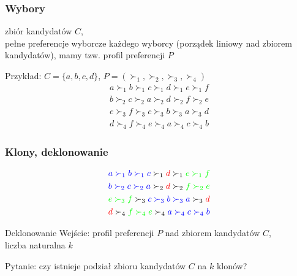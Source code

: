 \documentclass{beamer}
\begin{document}
\begin{frame} \frametitle{Wybory}
  zbiór kandydatów $C$, \\ 
  pełne preferencje wyborcze każdego wyborcy (porządek liniowy nad zbiorem kandydatów), mamy tzw. profil preferencji $P$

	\vfill

	Przykład: $C = \{a, b, c, d\}$, $P = (\succ_1, \succ_2, \succ_3, \succ_4)$
   	\begin{align*}
		a \succ_1 b \succ_1 c \succ_1 d \succ_1 e \succ_1 f \\
		b \succ_2 c \succ_2 a \succ_2 d \succ_2 f \succ_2 e \\
		e \succ_3 f \succ_3 c \succ_3 b \succ_3 a \succ_3 d \\
		d \succ_4 f \succ_4 e \succ_4 a \succ_4 c \succ_4 b
	\end{align*}
\end{frame}

\begin{frame} \frametitle{Klony, deklonowanie}
	\begin{align*}
		\textcolor{blue}{a \succ_1 b \succ_1 c} \succ_1 \textcolor{red}{d} \succ_1 \textcolor{green}{e \succ_1 f} \\
		\textcolor{blue}{b \succ_2 c \succ_2 a} \succ_2 \textcolor{red}{d} \succ_2 \textcolor{green}{f \succ_2 e} \\
		\textcolor{green}{e \succ_3 f} \succ_3 \textcolor{blue}{c \succ_3 b \succ_3 a} \succ_3 \textcolor{red}{d} \\
		\textcolor{red}{d} \succ_4 \textcolor{green}{f \succ_4 e} \succ_4 \textcolor{blue}{a \succ_4 c \succ_4 b}
	\end{align*}
	
	\begin{aproblem}{Deklonowanie}
    Wejście: profil preferencji $P$ nad zbiorem kandydatów $C$,\\
    	liczba naturalna $k$

    Pytanie: czy istnieje podział zbioru kandydatów $C$ na $k$ klonów?
  \end{aproblem}
\end{frame}
\end{document}
